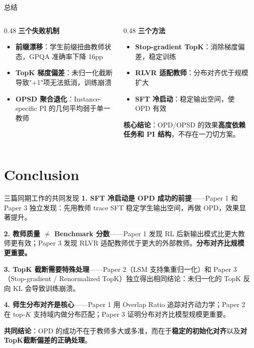 \documentclass{beamer}
\begin{document}
\begin{frame}[t]{总结}
  \begin{columns}[T,onlytextwidth]
    \begin{column}{0.48\textwidth}
      \textbf{三个失败机制}
      \begin{itemize}
        \item \textbf{前缀漂移}：学生前缀扭曲教师状态，GPQA 准确率下降 16pp
        \item \textbf{TopK 梯度偏差}：未归一化截断导致"+1"项无法抵消，训练崩溃
        \item \textbf{OPSD 聚合退化}：Instance-specific PI 的几何平均弱于单一教师
      \end{itemize}
    \end{column}
    \begin{column}{0.48\textwidth}
      \textbf{三个方法}
      \begin{itemize}
        \item \textbf{Stop-gradient TopK}：消除梯度偏差，稳定训练
        \item \textbf{RLVR 适配教师}：分布对齐优于规模扩大
        \item \textbf{SFT 冷启动}：稳定输出空间，使 OPD 有效
      \end{itemize}
      \vspace{0.1cm}
      \textbf{核心结论}：OPD/OPSD 的效果\textbf{高度依赖任务和 PI 结构}，不存在一刀切方案。
    \end{column}
  \end{columns}
\end{frame}

\section{Conclusion}

\begin{frame}[t]{三篇同期工作的共同发现}
  \textbf{1. SFT 冷启动是 OPD 成功的前提}——Paper 1 和 Paper 3 独立发现：先用教师 trace SFT 稳定学生输出空间，再做 OPD，效果显著提升。

  \textbf{2. 教师质量 $\neq$ Benchmark 分数}——Paper 1 发现 RL 后新输出模式比更大教师更有效；Paper 3 发现 RLVR 适配教师优于更大的外部教师。\textbf{分布对齐比规模更重要。}

  \textbf{3. TopK 截断需要特殊处理}——Paper 2（LSM 支持集重归一化）和 Paper 3（Stop-gradient / Renormalized TopK）独立得出相同结论：未归一化的 TopK 反向 KL 会导致训练崩溃。

  \textbf{4. 师生分布对齐是核心}——Paper 1 用 Overlap Ratio 追踪对齐动力学；Paper 2 在 top-$K$ 支持域内做分布匹配；Paper 3 证明分布对齐比模型规模更重要。

  \vspace{0.3cm}
  \textbf{共同结论}：OPD 的成功不在于教师多大或多准，而在于\textbf{稳定的初始化对齐}以及\textbf{对TopK截断偏差的正确处理}。
\end{frame}
\end{document}

